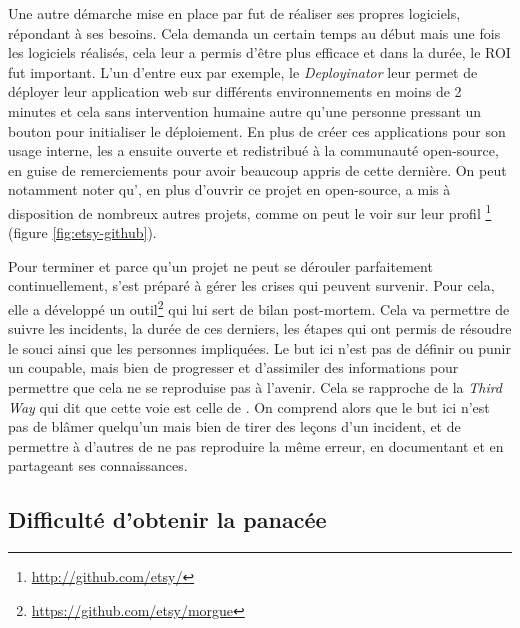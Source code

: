 Une autre démarche mise en place par \etsy{} fut de réaliser ses propres logiciels, répondant à ses besoins. Cela demanda un certain temps au début mais une fois les logiciels réalisés, cela leur a permis d'être plus efficace et dans la durée, le \gls{ROI} fut important. L'un d'entre eux par exemple, le \emph{Deployinator} leur permet de déployer leur application web sur différents environnements en moins de 2 minutes et cela sans intervention humaine autre qu'une personne pressant un bouton pour initialiser le déploiement. En plus de créer ces applications pour son usage interne, \etsy{} les a ensuite ouverte et redistribué à la communauté open-source, en guise de remerciements pour avoir beaucoup appris de cette dernière. On peut notamment noter qu'\etsy, en plus d'ouvrir ce projet en open-source, a mis à disposition de nombreux autres projets, comme on peut le voir sur leur profil \github\footnote{ \url{http://github.com/etsy/}} (figure \ref{fig:etsy-github}).


\clearpage

Pour terminer et parce qu'un projet ne peut se dérouler parfaitement continuellement, \etsy{} s'est préparé à gérer les crises qui peuvent survenir. Pour cela, elle a développé un outil\footnote{\url{https://github.com/etsy/morgue}} qui lui sert de bilan post-mortem\label{post-mortem}. Cela va permettre de suivre les incidents, la durée de ces derniers, les étapes qui ont permis de résoudre le souci ainsi que les personnes impliquées. Le but ici n'est pas de définir ou punir un coupable, mais bien de progresser et d'assimiler des informations pour permettre que cela ne se reproduise pas à l'avenir. Cela se rapproche de la \emph{Third Way} qui dit que cette voie est celle de . On comprend alors que le but ici n'est pas de blâmer quelqu'un mais bien de tirer des leçons d'un incident, et de permettre à d'autres de ne pas reproduire la même erreur, en documentant et en partageant ses connaissances.

\subsection{Difficulté d'obtenir la panacée}


